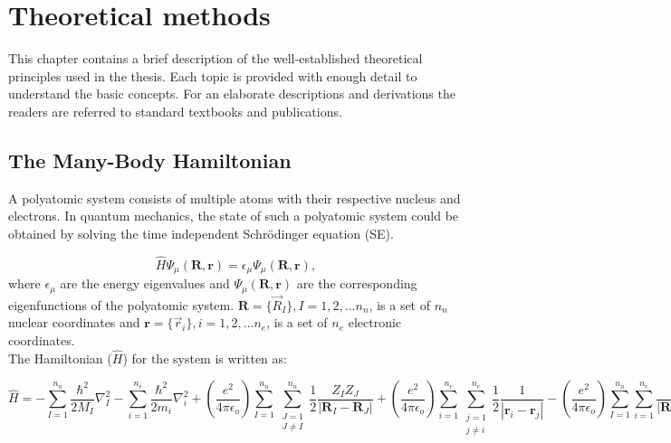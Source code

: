 \chapter{Theoretical methods}\label{theoreticalmethods}
 
\noindent This chapter contains a brief description of the well-established theoretical principles used in the thesis. Each topic is provided with enough detail to understand the basic concepts. For an elaborate descriptions and derivations the readers are referred to standard textbooks and publications\cite{parr1980density,dreizler2012density,tuckerman2010statistical,allen2017computer,marx2009ab,Martin2004}.  
 \section{The Many-Body Hamiltonian}
 
\noindent A polyatomic system consists of multiple atoms with their respective nucleus and electrons. In quantum mechanics, the state of such a polyatomic system could be obtained by solving the time independent Schr\"{o}dinger equation (SE).

 \begin{equation}
 \hat{H}\Psi_{\mu}(\textbf{R},\textbf{r})=\epsilon_{\mu}\Psi_{\mu}(\textbf{R},\textbf{r}),
 \label{MBH-1}
 \end{equation}
 \noindent where $\epsilon_{\mu}$ are the energy eigenvalues and $\Psi_{\mu}(\textbf{R},\textbf{r})$ are the corresponding eigenfunctions of the polyatomic system. $\textbf{R} = \{\vec{R}_I\}, I=1, 2, ... n_n $, is a set  of $n_n$ nuclear coordinates and $\textbf{r} = \{\vec{r}_i\}, i=1, 2, ... n_e $, is a set  of $n_e$ electronic coordinates.\\

\noindent The Hamiltonian ($\hat{H}$) for the system is written as:

\begin{dmath}
\label{MBH-2}
\hat{H}= - \sum_{I=1}^{n_n} \frac{\hbar ^2}{2M_I} \nabla_I^2 
    - \sum_{i=1}^{n_e} \frac{ \hbar^2}{2m_i} \nabla_i^2 
    + (\frac{e^2}{4\pi\epsilon_o}) \sum_{I=1}^{n_n} \sum_{\substack {J=1 \\J\not=I}}^{n_n} \frac{1}{2} \frac{Z_{I}Z_{J}}{|\textbf{R}_I - \textbf{R}_J|}
    + (\frac{e^2}{4\pi\epsilon_o}) \sum_{i=1}^{n_e} \sum_{\substack {j=1 \\ j\not=i}}^{n_e} \frac{1}{2} \frac{1}{|\textbf{r}_i - \textbf{r}_j|} 
    - (\frac{e^2}{4\pi\epsilon_o}) \sum_{I=1}^{n_n} \sum_{i=1}^{n_e} \frac{Z_{I}}{|\textbf{R}_I - \textbf{r}_i|},
\end{dmath}

